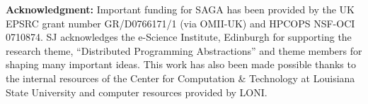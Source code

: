 \documentclass{rspublic}
\begin{document}
{\bf Acknowledgment:} Important funding for SAGA has been provided by
the UK EPSRC grant number GR/D0766171/1 (via OMII-UK) and HPCOPS
NSF-OCI 0710874. SJ acknowledges the e-Science Institute, Edinburgh
for supporting the research theme, ``Distributed Programming
Abstractions'' and theme members for shaping many important
ideas. This work has also been made possible thanks to the internal
resources of the Center for Computation \& Technology at Louisiana
State University and computer resources provided by LONI. 

%
 

\end{document}

